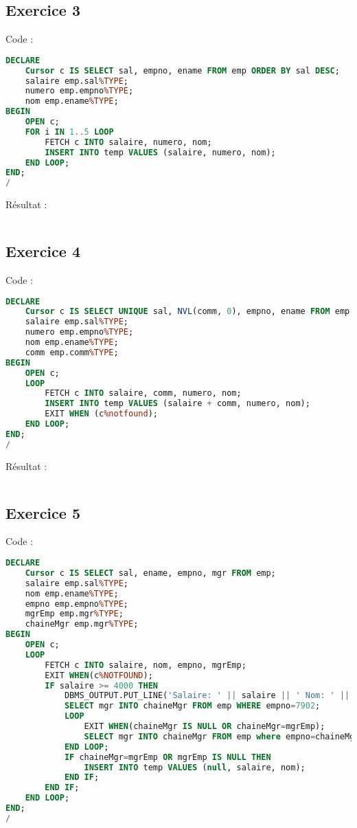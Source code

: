 \documentclass{article}
\begin{document}
\subsection{Exercice 3}
Code :
\begin{lstlisting}[language=SQL,
    deletekeywords={char},
    morekeywords={DECLARE, LOOP, TYPE, FOR, IF, IS, OPEN, FETCH, DBMS_OUTPUT, PUT_LINE}]
DECLARE
	Cursor c IS SELECT sal, empno, ename FROM emp ORDER BY sal DESC;
	salaire emp.sal%TYPE;
	numero emp.empno%TYPE;
	nom emp.ename%TYPE;
BEGIN
	OPEN c;
	FOR i IN 1..5 LOOP
		FETCH c INTO salaire, numero, nom;
		INSERT INTO temp VALUES (salaire, numero, nom);
	END LOOP;
END;
/
\end{lstlisting}

Résultat :
\begin{lstlisting}[language=SQL,
    morekeywords={DECLARE, LOOP, TYPE, FOR, IF, IS, OPEN, FETCH, DBMS_OUTPUT, PUT_LINE}]
\end{lstlisting}

\subsection{Exercice 4}
Code :
\begin{lstlisting}[language=SQL,
    deletekeywords={char},
    morekeywords={DECLARE, LOOP, TYPE, FOR, IF, IS, OPEN, FETCH, DBMS_OUTPUT, PUT_LINE}]
DECLARE
    Cursor c IS SELECT UNIQUE sal, NVL(comm, 0), empno, ename FROM emp WHERE sal + NVL(comm, 0) > 2000;
    salaire emp.sal%TYPE;
    numero emp.empno%TYPE;
    nom emp.ename%TYPE;
    comm emp.comm%TYPE;
BEGIN
	OPEN c;
	LOOP
		FETCH c INTO salaire, comm, numero, nom;
		INSERT INTO temp VALUES (salaire + comm, numero, nom);
		EXIT WHEN (c%notfound);
	END LOOP;
END;
/
\end{lstlisting}

Résultat :
\begin{lstlisting}[language=SQL,
    morekeywords={DECLARE, LOOP, TYPE, FOR, IF, IS, OPEN, FETCH, DBMS_OUTPUT, PUT_LINE}]
\end{lstlisting}

\subsection{Exercice 5}
Code :
\begin{lstlisting}[language=SQL,
    deletekeywords={char},
    morekeywords={DECLARE, LOOP, TYPE, FOR, IF, IS, OPEN, FETCH, DBMS_OUTPUT, PUT_LINE}]
DECLARE
	Cursor c IS SELECT sal, ename, empno, mgr FROM emp;
	salaire emp.sal%TYPE;
	nom emp.ename%TYPE;
	empno emp.empno%TYPE;
	mgrEmp emp.mgr%TYPE;
	chaineMgr emp.mgr%TYPE;
BEGIN
	OPEN c;
	LOOP
		FETCH c INTO salaire, nom, empno, mgrEmp;
		EXIT WHEN(c%NOTFOUND);
		IF salaire >= 4000 THEN
			DBMS_OUTPUT.PUT_LINE('Salaire: ' || salaire || ' Nom: ' || nom || ' no: ' || empno || ' mgr: ' || mgrEmp);
			SELECT mgr INTO chaineMgr FROM emp WHERE empno=7902;
			LOOP
				EXIT WHEN(chaineMgr IS NULL OR chaineMgr=mgrEmp);
				SELECT mgr INTO chaineMgr FROM emp where empno=chaineMgr;
			END LOOP;
			IF chaineMgr=mgrEmp OR mgrEmp IS NULL THEN
				INSERT INTO temp VALUES (null, salaire, nom);
			END IF;
		END IF;
	END LOOP;
END;
/
\end{lstlisting}
\end{document}
